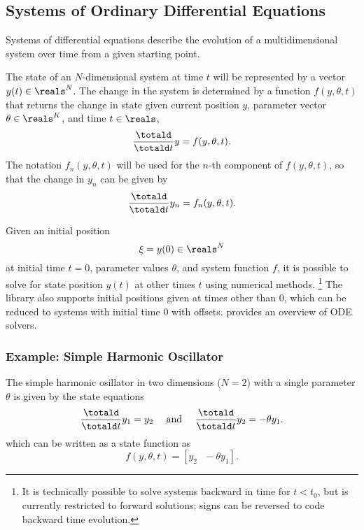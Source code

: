 \documentclass[10pt]{article}
\begin{document}
\subsection{Systems of Ordinary Differential Equations}

Systems of differential equations describe the evolution of a
multidimensional system over time from a given starting point.  

The state of an $N$-dimensional system at time $t$ will be represented
by a vector $y(t) \in \reals^N$. The change in the system is
determined by a function $f(y,\theta,t)$ that returns the change in
state given current position $y$, parameter vector $\theta \in
\reals^K$, and time $t \in \reals$,
\[
\frac{\totald}{\totald t} y = f(y,\theta,t).
\]
The notation $f_n(y,\theta,t)$ will be used for the $n$-th component
of $f(y,\theta,t)$, so that the change in $y_n$ can be given by
\[
\frac{\totald}{\totald t} y_n = f_n(y,\theta,t).
\]

Given an initial position 
\[
\xi = y(0) \in \reals^N
\]
at initial time $t = 0$, parameter values $\theta$, and system
function $f$, it is possible to solve for state position $y(t)$ at
other times $t$ using numerical methods.%
%
\footnote{It is technically possible to solve systems backward in time
  for $t < t_0$, but  is currently restricted to
  forward solutions; signs can be reversed to code backward time
  evolution.}
%
The  library also supports initial positions given
at times other than 0, which can be reduced to systems with initial
time 0 with offsets.  \cite[Chapter~17]{PressEtAl:2007} provides an
overview of ODE solvers. 


\subsubsection{Example: Simple Harmonic Oscillator}

The simple harmonic osillator in two dimensions ($N = 2$) with a
single parameter $\theta$ is given by the state equations
\[
\frac{\totald}{\totald t} y_1 = y_2
\ \ \ \ \mbox{and} \ \ \ \
\frac{\totald}{\totald t} y_2 = -\theta y_1.
\]
%
which can be written as a state function as
\[
f(y,\theta,t) = [y_2 \ \ \ -\theta y_1].
\]


\end{document}

